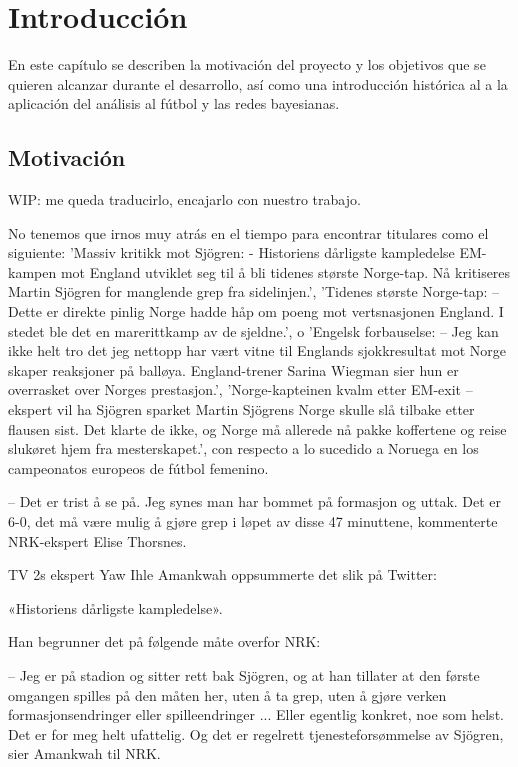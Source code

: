 \chapter{Introducción}

En este capítulo se describen la motivación del proyecto y los objetivos que
se quieren alcanzar durante el desarrollo, así como una introducción histórica al
a la aplicación del análisis al fútbol y las redes bayesianas. 

\section{Motivación}

WIP: me queda traducirlo, encajarlo con nuestro trabajo. 

No tenemos que irnos muy atrás en el tiempo para encontrar titulares como 
el siguiente: 'Massiv kritikk mot Sjögren: - Historiens dårligste kampledelse
EM-kampen mot England utviklet seg til å bli tidenes største Norge-tap. Nå kritiseres Martin 
Sjögren for manglende grep fra sidelinjen.', 'Tidenes største Norge-tap: – Dette er direkte pinlig
Norge hadde håp om poeng mot vertsnasjonen England. I stedet ble det en marerittkamp av de sjeldne.', 
o 'Engelsk forbauselse: – Jeg kan ikke helt tro det jeg nettopp har vært vitne til
Englands sjokkresultat mot Norge skaper reaksjoner på balløya. England-trener Sarina Wiegman sier 
hun er overrasket over Norges prestasjon.', 'Norge-kapteinen kvalm etter EM-exit – ekspert vil ha Sjögren sparket
Martin Sjögrens Norge skulle slå tilbake etter flausen sist. Det klarte de ikke, og Norge må allerede nå pakke 
koffertene og reise slukøret hjem fra mesterskapet.', con respecto a lo sucedido 
a Noruega en los campeonatos europeos de fútbol femenino. 

– Det er trist å se på. Jeg synes man har bommet på formasjon og uttak. Det 
er 6-0, det må være mulig å gjøre grep i løpet av disse 47 minuttene, 
kommenterte NRK-ekspert Elise Thorsnes.

TV 2s ekspert Yaw Ihle Amankwah oppsummerte det slik på Twitter:

«Historiens dårligste kampledelse».

Han begrunner det på følgende måte overfor NRK:

– Jeg er på stadion og sitter rett bak Sjögren, og at han tillater 
at den første omgangen spilles på den måten her, uten å ta grep, 
uten å gjøre verken formasjonsendringer eller spilleendringer ... 
Eller egentlig konkret, noe som helst. Det er for meg helt ufattelig. 
Og det er regelrett tjenesteforsømmelse av Sjögren, sier Amankwah til NRK.

